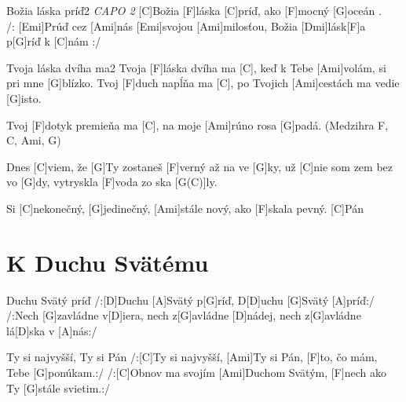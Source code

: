 \documentclass[12pt]{article}
\begin{document}
\begin{song}{Božia láska príď}{2}
	\textit{CAPO 2}
	[C]Božia [F]láska [C]príď, ako [F]mocný [G]oceán .
	\\
	/: [Emi]Prúď cez [Ami]nás [Emi]svojou [Ami]milosťou, 
	Božia [Dmi]lásk[F]a p[G]ríď k [C]nám :/
	\columnbreak
\end{song}

\begin{song}{Tvoja láska dvíha ma}{2}
Tvoja [F]láska dvíha ma [C], keď k Tebe [Ami]volám, si pri mne [G]blízko.
Tvoj [F]duch napĺňa ma [C], po Tvojich [Ami]cestách ma vedie [G]isto.

Tvoj [F]dotyk premieňa ma [C], 
na moje [Ami]rúno rosa [G]padá.
\columnbreak
(Medzihra F, C, Ami, G)

Dnes [C]viem, že [G]Ty zostaneš [F]verný až na ve [G]ky,
už [C]nie som zem bez vo [G]dy, vytryskla [F]voda zo ska [G(C)]ly.

Si [C]nekonečný, [G]jedinečný, [Ami]stále nový, ako [F]skala pevný. [C]Pán
\end{song}

\newpage
\section{K Duchu Svätému}

\begin{songgroup}{2}
	\begin{groupitem}{Duchu Svätý príď}
		/:[D]Duchu [A]Svätý p[G]ríď,
		D[D]uchu [G]Svätý [A]príď:/
		\\
		/:Nech [G]zavládne v[D]iera,
		nech z[G]avládne [D]nádej,
		nech z[G]avládne lá[D]ska v [A]nás:/
	\end{groupitem}
	\columnbreak
	\begin{groupitem}{Ty si najvyšší, Ty si Pán}
		/:[C]Ty si najvyšší, [Ami]Ty si Pán,
		[F]to, čo mám, Tebe [G]ponúkam.:/
		/:[C]Obnov ma svojím [Ami]Duchom Svätým,
		[F]nech ako Ty [G]stále svietim.:/
	\end{groupitem}
\end{songgroup}
\end{document}
